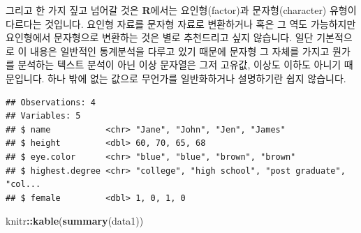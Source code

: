 \documentclass[]{book}
\newenvironment{Shaded}{\begin{snugshade}}{\end{snugshade}}
\newcommand{\CommentTok}[1]{\textcolor[rgb]{0.56,0.35,0.01}{\textit{#1}}}
\newcommand{\KeywordTok}[1]{\textcolor[rgb]{0.13,0.29,0.53}{\textbf{#1}}}
\newcommand{\NormalTok}[1]{#1}
\newcommand{\OperatorTok}[1]{\textcolor[rgb]{0.81,0.36,0.00}{\textbf{#1}}}
\newcommand{\OtherTok}[1]{\textcolor[rgb]{0.56,0.35,0.01}{#1}}
\newcommand{\StringTok}[1]{\textcolor[rgb]{0.31,0.60,0.02}{#1}}
\begin{document}
\begin{Shaded}
\end{Shaded}

그리고 한 가지 짚고 넘어갈 것은 \textbf{R}에서는 요인형(factor)과 문자형(character) 유형이 다르다는 것입니다. 요인형 자료를 문자형 자료로 변환하거나 혹은 그 역도 가능하지만 요인형에서 문자형으로 변환하는 것은 별로 추천드리고 싶지 않습니다. 일단 기본적으로 이 내용은 일반적인 통계분석을 다루고 있기 때문에 문자형 그 자체를 가지고 뭔가를 분석하는 텍스트 분석이 아닌 이상 문자열은 그저 고유값, 이상도 이하도 아니기 때문입니다. 하나 밖에 없는 값으로 무언가를 일반화하거나 설명하기란 쉽지 않습니다.

\begin{Shaded}
\end{Shaded}

\begin{verbatim}
## Observations: 4
## Variables: 5
## $ name           <chr> "Jane", "John", "Jen", "James"
## $ height         <dbl> 60, 70, 65, 68
## $ eye.color      <chr> "blue", "blue", "brown", "brown"
## $ highest.degree <chr> "college", "high school", "post graduate", "col...
## $ female         <dbl> 1, 0, 1, 0
\end{verbatim}

\begin{Shaded}
\begin{Highlighting}[]
\NormalTok{knitr}\OperatorTok{::}\KeywordTok{kable}\NormalTok{(}\KeywordTok{summary}\NormalTok{(data1))}
\end{Highlighting}
\end{Shaded}
\end{document}
